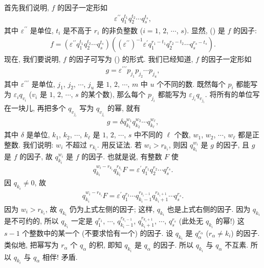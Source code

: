 \begin{pf}
    首先我们说明, $f$ 的因子一定形如
    \begin{align*}
        \varepsilon^{\prime \prime} q_1^{t_1} q_2^{t_2} \cdots q_s^{t_s}, \tag*{(\myStar)}
    \end{align*}
    其中 $\varepsilon^{\prime \prime}$ 是单位, $t_i$ 是不高于 $r_i$ 的非负整数 ($i = 1$, $2$, $\cdots$, $s$). 显然, (\myStar) 是 $f$ 的因子:
    \begin{align*}
        f = \left(\varepsilon^{\prime \prime} q_1^{t_1} q_2^{t_2} \cdots q_s^{t_s}\right) \left((\varepsilon^{\prime \prime})^{-1} \varepsilon^{\prime} q_1^{r_1 - t_1} q_2^{r_2 - t_2} \cdots q_s^{r_s - t_s}\right).
    \end{align*}
    现在, 我们要说明, $f$ 的因子可写为 (\myStar) 的形式. 我们已经知道, $f$ 的因子一定形如
    \begin{align*}
        g = \varepsilon^{\prime \prime \prime} p_{j_1} p_{j_2} \cdots p_{j_u},
    \end{align*}
    其中 $\varepsilon^{\prime \prime \prime}$ 是单位, $j_1$, $j_2$, $\cdots$, $j_u$ 是 $1$, $2$, $\cdots$, $m$ 中 $u$ 个不同的数. 既然每个 $p_i$ 都能写为 $\varepsilon_i q_{v_i}$ ($v_i$ 是 $1$, $2$, $\cdots$, $s$ 的某个数), 那么每个 $p_{j_i}$ 都能写为 $\varepsilon_{j_i} q_{v_{j_i}}$. 将所有的单位写在一块儿, 再把多个 $q_{v_{j_i}}$ 写为 $q_{v_{j_i}}$ 的幂, 就有
    \begin{align*}
        g = \delta q_{k_1}^{w_1} q_{k_2}^{w_2} \cdots q_{k_\ell}^{w_\ell},
    \end{align*}
    其中 $\delta$ 是单位, $k_1$, $k_2$, $\cdots$, $k_\ell$ 是 $1$, $2$, $\cdots$, $s$ 中不同的 $\ell$ 个数, $w_1$, $w_2$, $\cdots$, $w_\ell$ 都是正整数. 我们说明: $w_i$ 不超过 $r_{k_i}$. 用反证法. 若 $w_i > r_{k_i}$, 则因 $q_{k_i}^{w_i}$ 是 $g$ 的因子, 且 $g$ 是 $f$ 的因子, 故 $q_{k_i}^{w_i}$ 是 $f$ 的因子. 也就是说, 有整数 $F$ 使
    \begin{align*}
        q_{k_i}^{w_i-r_{k_i}} q_{k_i}^{r_{k_i}} F = \varepsilon^{\prime} q_1^{r_1} q_2^{r_2} \cdots q_s^{r_s}.
    \end{align*}
    因 $q_{k_i} \neq 0$, 故
    \begin{align*}
        q_{k_i}^{w_i-r_{k_i}} F = \varepsilon^{\prime} q_1^{r_1} \cdots q_{k_i - 1}^{r_{k_i - 1}} q_{k_i + 1}^{r_{k_i + 1}} \cdots q_s^{r_s}.
    \end{align*}
    因为 $w_i > r_{k_i}$, 故 $q_{k_i}$ 仍为上式左侧的因子; 这样, $q_{k_i}$ 也是上式右侧的因子. 因为 $q_{k_i}$ 是不可约的, 所以 $q_{k_i}$ 一定是 $q_1^{r_1}$, $\cdots$, $q_{k_i - 1}^{r_{k_i - 1}}$, $q_{k_i + 1}^{r_{k_i + 1}}$, $\cdots$, $q_s^{r_s}$ (此处无 $q_{k_i}$ 的幂!) 这 $s-1$ 个整数中的某一个 (不要求恰有一个) 的因子. 设 $q_{k_i}$ 是 $q_\alpha^{r_\alpha}$ ($r_\alpha \neq k_i$) 的因子. 类似地, 把幂写为 $r_\alpha$ 个 $q_\alpha$ 的积, 即知 $q_{k_i}$ 是 $q_\alpha$ 的因子. 所以 $q_{k_i}$ 与 $q_\alpha$ 不互素. 所以 $q_{k_i}$ 与 $q_\alpha$ 相伴! 矛盾.


\end{pf}
